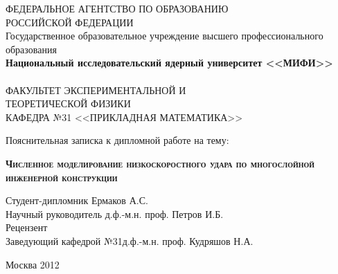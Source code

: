 \begin{titlepage}
\newpage

\begin{center}
ФЕДЕРАЛЬНОЕ АГЕНТСТВО ПО ОБРАЗОВАНИЮ\\РОССИЙСКОЙ ФЕДЕРАЦИИ\\
Государственное образовательное учреждение высшего профессионального образования\\
\textbf{Национальный исследовательский ядерный университет <<МИФИ>>}\\
\hrulefill\\
ФАКУЛЬТЕТ ЭКСПЕРИМЕНТАЛЬНОЙ И\\ТЕОРЕТИЧЕСКОЙ ФИЗИКИ\\
\vspace{1cm}
КАФЕДРА №31 <<ПРИКЛАДНАЯ МАТЕМАТИКА>>\\
\end{center}

\vspace{2em}

\begin{center}
\Large Пояснительная записка к дипломной работе на тему:
\end{center}

\vspace{0.5em}

\begin{center}
\textsc{\textbf{Численное моделирование низкоскоростного удара по многослойной инженерной конструкции}}
\end{center}

\vspace{3em}

\begin{flushleft}
\vspace{1.5em}
Студент-дипломник \hrulefill Ермаков А.С.\\
\vspace{1.5em}
Научный руководитель \hrulefill д.ф.-м.н. проф. Петров И.Б.\\
\vspace{1.5em}
Рецензент \hrulefill \\
\vspace{1.5em}
Заведующий кафедрой №31\hrulefill д.ф.-м.н. проф. Кудряшов Н.А.\\
\end{flushleft}

\vspace{\fill}
\begin{center}
Москва 2012
\end{center}

\end{titlepage}
